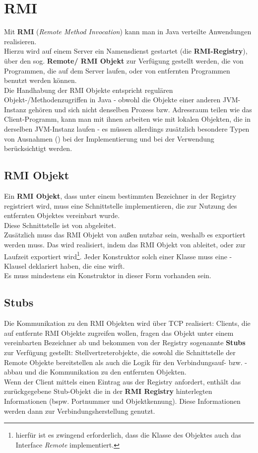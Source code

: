 \section{RMI}

Mit \textbf{RMI} (\textit{Remote Method Invocation}) kann man in Java verteilte Anwendungen realisieren.\\
Hierzu wird auf einem Server ein Namensdienst gestartet (die \textbf{RMI-Registry}), über den sog. \textbf{Remote/ RMI Objekt} zur Verfügung gestellt werden, die von Programmen, die auf dem Server laufen, oder von entfernten Programmen benutzt werden können.\\
Die Handhabung der RMI Objekte entspricht regulären Objekt-/Methodenzugriffen in Java - obwohl die Objekte einer anderen JVM-Instanz gehören und sich nicht denselben Prozess {bzw.} Adressraum teilen wie das Client-Programm, kann man mit ihnen arbeiten wie mit lokalen Objekten, die in derselben JVM-Instanz laufen - es müssen allerdings zusätzlich besondere Typen von Ausnahmen () bei der Implementierung und bei der Verwendung berücksichtigt werden.\\


\subsection*{RMI Objekt}
Ein \textbf{RMI Objekt}, dass unter einem bestimmten Bezeichner in der Registry registriert wird, muss eine Schnittstelle implementieren, die zur Nutzung des entfernten Objektes vereinbart wurde.\\
Diese Schnittstelle ist von  abgeleitet.\\
Zusätzlich muss das RMI Objekt von außen nutzbar sein, weshalb es exportiert werden muss.
Das wird realisiert, indem das RMI Objekt von  ableitet, oder zur Laufzeit exportiert wird\footnote{
hierfür ist es zwingend erforderlich, dass die Klasse des Objektes auch das Interface \textit{Remote} implementiert.
}.
Jeder Konstruktor solch einer Klasse muss eine -Klausel deklariert haben, die eine  wirft.\\
Es muss mindestens ein Konstruktor in dieser Form vorhanden sein.

\subsection*{Stubs}
Die Kommunikation zu den RMI Objekten wird über TCP realisiert: Clients, die auf entfernte RMI Objekte zugreifen wollen, fragen das Objekt unter einem vereinbarten Bezeichner ab und bekommen von der Registry sogenannte \textbf{Stubs} zur Verfügung gestellt: Stellvertreterobjekte, die sowohl die Schnittstelle der Remote Objekte bereitstellen als auch die Logik für den Verbindungsauf- bzw. -abbau und die Kommunikation zu den entfernten Objekten.\\
Wenn der Client mittels  einen Eintrag aus der Registry anfordert, enthält das zurückgegebene Stub-Objekt die in der \textbf{RMI Registry} hinterlegten Informationen (bspw. Portnummer und Objektkennung).
Diese Informationen werden dann zur Verbindungsherstellung genutzt.

